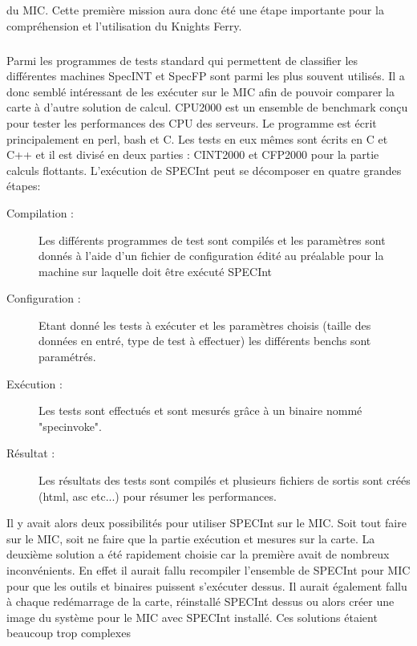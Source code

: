 \documentclass[11pt]{article}
\begin{document}
					du MIC. Cette première mission aura donc été une étape importante pour la compréhension et l'utilisation 
					du Knights Ferry.
					\subparagraph{}
					Parmi les programmes de tests standard qui permettent de classifier les différentes machines SpecINT et 
					SpecFP sont parmi les plus souvent utilisés. Il a donc semblé intéressant de les exécuter sur le MIC
					afin de pouvoir comparer la carte à d'autre solution de calcul. \newline
					CPU2000 est un ensemble de benchmark conçu pour tester les performances des CPU des serveurs. Le programme
					est écrit principalement en perl, bash et C. Les tests en eux mêmes sont écrits en C et C++ et il est 
					divisé en deux parties : CINT2000 et CFP2000 pour la partie calculs flottants. \newline
					L'exécution de SPECInt peut se décomposer en quatre grandes étapes: \newline
					\begin{description}
					\item[Compilation :]
						Les différents programmes de test sont compilés et les paramètres sont donnés à l'aide d'un fichier
						de configuration édité au préalable pour la machine sur laquelle doit être exécuté SPECInt
					\item [Configuration :]
						Etant donné les tests à exécuter et les paramètres choisis (taille des données en entré, type de test
						à effectuer) les différents benchs sont paramétrés.
					\item [Exécution :]
						Les tests sont effectués et sont mesurés grâce à un binaire nommé "specinvoke".
					\item [Résultat :]
						Les résultats des tests sont compilés et plusieurs fichiers de sortis sont créés (html, asc etc...)
						pour résumer les performances.
					\end{description}
					Il y avait alors deux possibilités pour utiliser SPECInt sur le MIC. Soit tout faire sur le MIC, soit 
					ne faire que la partie exécution et mesures sur la carte. \newline
					La deuxième solution a été rapidement choisie car la première avait de nombreux inconvénients. En effet il 
					aurait fallu recompiler l'ensemble de SPECInt pour MIC pour que les outils et binaires puissent s'exécuter
					dessus. Il aurait également fallu à chaque redémarrage de la carte, réinstallé SPECInt dessus ou alors 
					créer une image du système pour le MIC avec SPECInt installé. Ces solutions étaient beaucoup trop complexes
\end{document}
